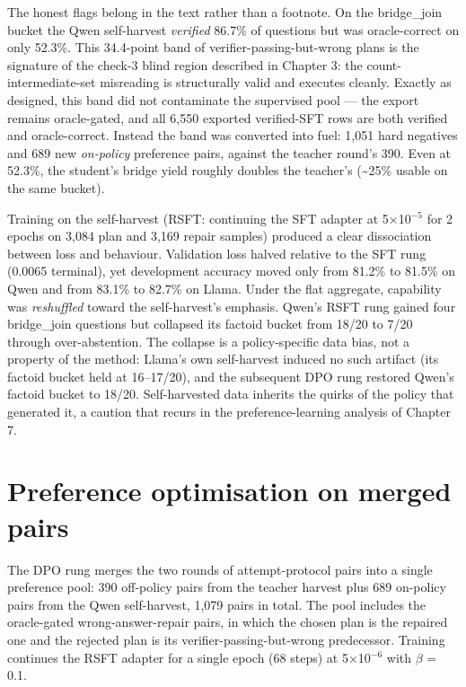 The honest flags belong in the text rather than a footnote. On the bridge\_join bucket the Qwen
self-harvest \emph{verified} 86.7\% of questions but was oracle-correct on only 52.3\%. This
34.4-point band of verifier-passing-but-wrong plans is the signature of the check-3 blind
region described in Chapter 3: the count-intermediate-set misreading is structurally valid and
executes cleanly. Exactly as designed, this band did not contaminate the supervised pool --- the
export remains oracle-gated, and all 6,550 exported verified-SFT rows are both verified and
oracle-correct. Instead the band was converted into fuel: 1,051 hard negatives and 689 new
\emph{on-policy} preference pairs, against the teacher round's 390. Even at 52.3\%, the student's
bridge yield roughly doubles the teacher's (\textasciitilde{}25\% usable on the same bucket).

Training on the self-harvest (RSFT: continuing the SFT adapter at 5$\times$10$^{-5}$ for 2 epochs on
3,084 plan and 3,169 repair samples) produced a clear dissociation between loss and behaviour.
Validation loss halved relative to the SFT rung (0.0065 terminal), yet development accuracy
moved only from 81.2\% to 81.5\% on Qwen and from 83.1\% to 82.7\% on Llama. Under the flat
aggregate, capability was \emph{reshuffled} toward the self-harvest's emphasis. Qwen's RSFT rung
gained four bridge\_join questions but collapsed its factoid bucket from 18/20 to 7/20 through
over-abstention. The collapse is a policy-specific data bias, not a property of the method:
Llama's own self-harvest induced no such artifact (its factoid bucket held at 16--17/20), and
the subsequent DPO rung restored Qwen's factoid bucket to 18/20. Self-harvested data inherits
the quirks of the policy that generated it, a caution that recurs in the preference-learning
analysis of Chapter 7.

\section{Preference optimisation on merged pairs}\label{sec:preference-optimisation-on-merged-pairs}

The DPO rung merges the two rounds of attempt-protocol pairs into a single preference pool:
390 off-policy pairs from the teacher harvest plus 689 on-policy pairs from the Qwen
self-harvest, 1,079 pairs in total. The pool includes the oracle-gated wrong-answer-repair
pairs, in which the chosen plan is the repaired one and the rejected plan is its
verifier-passing-but-wrong predecessor. Training continues the RSFT adapter for a single epoch
(68 steps) at 5$\times$10$^{-6}$ with $\beta$ = 0.1.

